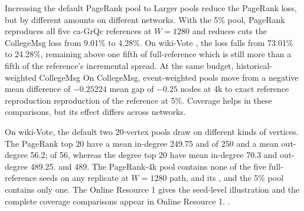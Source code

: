 \documentclass[smallextended]{svjour3}
\newcommand{\CollegePRLoss}{9.01}
\newcommand{\CollegePRfiveLoss}{4.28}
\newcommand{\WikiPRLoss}{73.01}
\newcommand{\WikiPRfiveLoss}{24.28}
\providecommand{\DIFaddtex}[1]{{\protect\color{blue} \sf #1}} %
\providecommand{\DIFdeltex}[1]{{\protect\color{red} \scriptsize #1}} %
\providecommand{\DIFaddbegin}{} %
\providecommand{\DIFaddend}{} %
\providecommand{\DIFdelbegin}{} %
\providecommand{\DIFdelend}{} %
\providecommand{\DIFadd}[1]{\texorpdfstring{\DIFaddtex{#1}}{#1}} %
\providecommand{\DIFdel}[1]{\texorpdfstring{\DIFdeltex{#1}}{}} %
\providecommand{\DIFscaledelfig}{0.5}
\newlength{\DIFdelgraphicswidth} %
\newlength{\DIFdelgraphicsheight} %
\providecommand{\DIFaddincludegraphics}[2][]{{\color{blue}\fbox{\DIFOincludegraphics[#1]{#2}}}} %
\providecommand{\DIFdelincludegraphics}[2][]{%
\sbox{\DIFdelgraphicsbox}{\DIFOincludegraphics[#1]{#2}}%
\settoboxwidth{\DIFdelgraphicswidth}{\DIFdelgraphicsbox} %
\settoboxtotalheight{\DIFdelgraphicsheight}{\DIFdelgraphicsbox} %
\scalebox{\DIFscaledelfig}{%
\parbox[b]{\DIFdelgraphicswidth}{\usebox{\DIFdelgraphicsbox}\\[-\baselineskip] \rule{\DIFdelgraphicswidth}{0em}}\llap{\resizebox{\DIFdelgraphicswidth}{\DIFdelgraphicsheight}{%
\setlength{\unitlength}{\DIFdelgraphicswidth}%
\begin{picture}(1,1)%
\thicklines\linethickness{2pt} %
{\color[rgb]{1,0,0}\put(0,0){\framebox(1,1){}}}%
{\color[rgb]{1,0,0}\put(0,0){\line( 1,1){1}}}%
{\color[rgb]{1,0,0}\put(0,1){\line(1,-1){1}}}%
\end{picture}%
}\hspace*{3pt}}} %
} %
\DeclareRobustCommand{\DIFaddbegin}{\DIFOaddbegin \let\includegraphics\DIFaddincludegraphics} %
\DeclareRobustCommand{\DIFaddend}{\DIFOaddend \let\includegraphics\DIFOincludegraphics} %
\DeclareRobustCommand{\DIFdelbegin}{\DIFOdelbegin \let\includegraphics\DIFdelincludegraphics} %
\DeclareRobustCommand{\DIFdelend}{\DIFOaddend \let\includegraphics\DIFOincludegraphics} %
\begin{document}
\DIFdel{Increasing the default PageRank pool to }\DIFdelend \DIFaddbegin \DIFadd{Larger pools reduce the PageRank loss, but by different amounts on different networks. With the }\DIFaddend 5\% \DIFaddbegin \DIFadd{pool, PageRank }\DIFaddend reproduces all five ca-GrQc references at $W=1280$ and \DIFdelbegin \DIFdel{reduces }\DIFdelend \DIFaddbegin \DIFadd{cuts the }\DIFaddend CollegeMsg loss from \CollegePRLoss{}\% to \CollegePRfiveLoss{}\%. On wiki-Vote \DIFdelbegin \DIFdel{, }\DIFdelend \DIFaddbegin \DIFadd{the }\DIFaddend loss falls from \WikiPRLoss{}\% to \WikiPRfiveLoss{}\%, \DIFdelbegin \DIFdel{remaining above one fifth of full-reference }\DIFdelend \DIFaddbegin \DIFadd{which is still more than a fifth of the reference's }\DIFaddend incremental spread. \DIFdelbegin \DIFdel{At the same budget, historical-weighted CollegeMsg}\DIFdelend \DIFaddbegin \DIFadd{On CollegeMsg, event-weighted }\DIFaddend pools move from a \DIFdelbegin \DIFdel{negative mean difference of $-0.25224$ }\DIFdelend \DIFaddbegin \DIFadd{mean gap of $-0.25$ }\DIFaddend nodes at 4k to exact \DIFdelbegin \DIFdel{reference reproduction }\DIFdelend \DIFaddbegin \DIFadd{reproduction of the reference }\DIFaddend at 5\%.
\DIFdelbegin \DIFdel{Coverage helps in these comparisons, but its effect differs across networks.
}\DIFdelend 

On wiki-Vote, the \DIFdelbegin \DIFdel{default }\DIFdelend \DIFaddbegin \DIFadd{two 20-vertex pools draw on different kinds of vertices. The }\DIFaddend PageRank top 20 have \DIFaddbegin \DIFadd{a }\DIFaddend mean in-degree \DIFdelbegin \DIFdel{249.75 and }\DIFdelend \DIFaddbegin \DIFadd{of 250 and a mean }\DIFaddend out-degree \DIFdelbegin \DIFdel{56.2; }\DIFdelend \DIFaddbegin \DIFadd{of 56, whereas }\DIFaddend the degree top 20 have \DIFdelbegin \DIFdel{mean in-degree 70.3 and out-degree 489.25. }\DIFdelend \DIFaddbegin \DIFadd{70 and 489. }\DIFaddend The PageRank-4k pool contains none of the five full-reference seeds on any \DIFaddbegin \DIFadd{replicate at }\DIFaddend $W=1280$\DIFdelbegin \DIFdel{path, and its }\DIFdelend \DIFaddbegin \DIFadd{, and the }\DIFaddend 5\% pool contains only one. \DIFdelbegin \DIFdel{The }\DIFdelend \DIFaddbegin \DIFadd{Online Resource 1 gives the }\DIFaddend seed-level illustration and \DIFaddbegin \DIFadd{the }\DIFaddend complete coverage comparisons\DIFdelbegin \DIFdel{appear in Online Resource 1.
}\DIFdelend \DIFaddbegin \DIFadd{.
}\DIFaddend 
\end{document}
